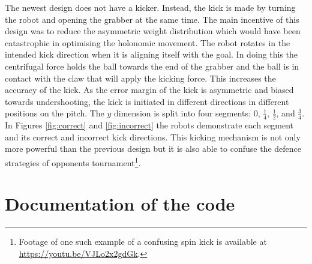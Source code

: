 \documentclass[a4paper,12pt]{article}
\begin{document}
The newest design does not have a kicker. Instead, the kick is made by turning the robot and opening the grabber at the same time. The main incentive of this design was to reduce the asymmetric weight distribution which would have been catastrophic in optimising the holonomic movement. The robot rotates in the intended kick direction when it is aligning itself with the goal. In doing this the centrifugal force holds the ball towards the end of the grabber and the ball is in contact with the claw that will apply the kicking force. This increases the accuracy of the kick. As the error margin of the kick is asymmetric and biased towards undershooting, the kick is initiated in different directions in different positions on the pitch. The $y$ dimension is split into four segments: $0$, $\frac{1}{4}$, $\frac{1}{2}$, and $\frac{3}{4}$. In Figures \ref{fig:correct} and \ref{fig:incorrect} the robots demonstrate each segment and its correct and incorrect kick directions. This kicking mechanism is not only more powerful than the previous design but it is also able to confuse the defence strategies of opponents tournament\footnote{Footage of one such example of a confusing spin kick is available at \url{https://youtu.be/VJLo2x2gdGk}.}.

\section{Documentation of the code}
\end{document}
